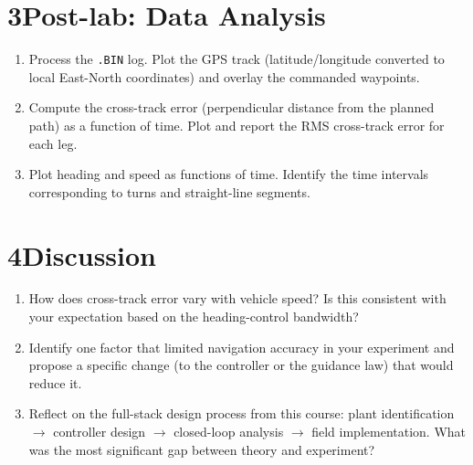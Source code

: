 \documentclass[11pt]{article}
\begin{document}
\section*{3\quad Post-lab: Data Analysis}

\begin{enumerate}[resume]

\item Process the \texttt{.BIN} log.  Plot the GPS track (latitude/longitude
  converted to local East-North coordinates) and overlay the commanded
  waypoints.

\item Compute the cross-track error (perpendicular distance from the planned
  path) as a function of time.  Plot and report the RMS cross-track error for
  each leg.

\item Plot heading and speed as functions of time.  Identify the time intervals
  corresponding to turns and straight-line segments.

\end{enumerate}

\section*{4\quad Discussion}

\begin{enumerate}[resume]

\item How does cross-track error vary with vehicle speed?  Is this consistent
  with your expectation based on the heading-control bandwidth?

\item Identify one factor that limited navigation accuracy in your experiment
  and propose a specific change (to the controller or the guidance law) that
  would reduce it.

\item Reflect on the full-stack design process from this course: plant
  identification $\to$ controller design $\to$ closed-loop analysis $\to$
  field implementation.  What was the most significant gap between theory and
  experiment?

\end{enumerate}
\end{document}
